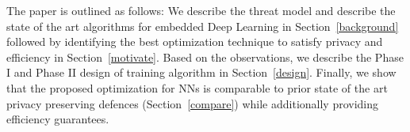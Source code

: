The paper is outlined as follows: We describe the threat model and describe the state of the art algorithms for embedded Deep Learning in Section~\ref{background} followed by identifying the best optimization technique to satisfy privacy and efficiency in Section~\ref{motivate}. Based on the observations, we describe the Phase I and Phase II design of \method\hspace{0.02in} training algorithm in Section~\ref{design}.
Finally, we show that the proposed optimization for NNs is comparable to prior state of the art privacy preserving defences (Section~\ref{compare}) while additionally providing efficiency guarantees.
